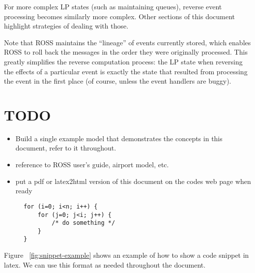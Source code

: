 \documentclass[conference,10pt,compsocconf,onecolumn]{IEEEtran}
\begin{document}
For more complex LP states (such as maintaining queues), reverse event
processing becomes similarly more complex. Other sections of this document
highlight strategies of dealing with those.

Note that ROSS maintains the ``lineage'' of events currently stored, which
enables ROSS to roll back the messages in the order they were originally
processed. This greatly simplifies the reverse computation process: the LP state
when reversing the effects of a particular event is exactly the state that
resulted from processing the event in the first place (of course, unless the
event handlers are buggy).

\section{TODO}

\begin{itemize}
\item Build a single example model that demonstrates the concepts in this
document, refer to it throughout.
\item reference to ROSS user's guide, airport model, etc.
\item put a pdf or latex2html version of this document on the codes web page
when ready
\end{itemize}

\begin{figure}
\begin{lstlisting}[caption=Example code snippet., label=snippet-example]
for (i=0; i<n; i++) {
    for (j=0; j<i; j++) {
        /* do something */
    }
}
\end{lstlisting}
\end{figure}

Figure ~\ref{fig:snippet-example} shows an example of how to show a code
snippet in latex.  We can use this format as needed throughout the document.
\end{document}
